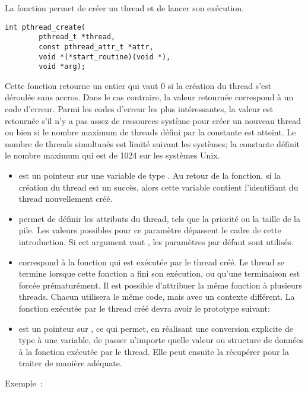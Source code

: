 \label{func:pthread_create}
La fonction  permet de créer un thread et de lancer son exécution.
\begin{lstlisting}
int pthread_create(
		pthread_t *thread,
		const pthread_attr_t *attr,
		void *(*start_routine)(void *),
		void *arg);
\end{lstlisting}

Cette fonction retourne un entier qui vaut 0 si la création du thread s'est déroulée sans accros. Dans le cas contraire, la valeur retournée correspond à un code d'erreur.
Parmi les codes d'erreur les plus intéressantes, la valeur  est retournée s'il n'y a pas assez de ressources système pour créer un nouveau thread ou bien si le nombre maximum de threads défini par la constante  est atteint. Le nombre de threads simultanés est limité suivant les systèmes; la constante  définit le nombre maximum qui est de 1024 sur les systèmes Unix.
\begin{itemize}
\item{} est un pointeur sur une variable de type . Au retour de la fonction, si la création du thread est un succès, alors cette variable contient l'identifiant du thread nouvellement créé.

\item{} permet de définir les attributs du thread, tels que la priorité ou la taille de la pile. Les valeurs possibles pour ce paramètre dépassent le cadre de cette introduction. Si cet argument vaut , les paramètres par défaut sont utilisés.

\item{} correspond à la fonction qui est exécutée par le thread créé. Le thread se termine lorsque cette fonction a fini son exécution, ou qu'une terminaison est forcée prématurément. Il est possible d'attribuer la même fonction à plusieurs threads. Chacun utilisera le même code, mais avec un contexte différent. La fonction exécutée par le thread créé devra avoir le prototype suivant:

\hspace{1cm}

\item{} est un pointeur sur , ce qui permet, en réalisant une conversion explicite de type à une variable, de passer n'importe quelle valeur ou structure de données à la fonction exécutée par le thread. Elle peut ensuite la récupérer pour la traiter de manière adéquate.
\end{itemize}
Exemple~:

